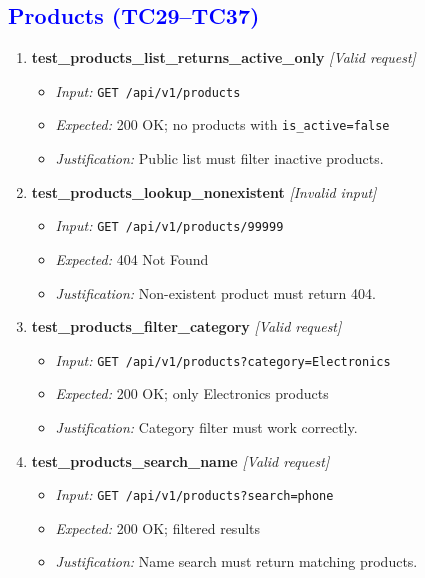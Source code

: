 \documentclass{article}
\begin{document}
\subsection*{\textcolor{blue}{Products (TC29--TC37)}}
\begin{enumerate}[resume, label=\textbf{TC\arabic*.}]

\item \textbf{test\_products\_list\_returns\_active\_only} \textit{[Valid request]}
\begin{itemize}[noitemsep]
  \item \textit{Input:} \texttt{GET /api/v1/products}
  \item \textit{Expected:} 200 OK; no products with \texttt{is\_active=false}
  \item \textit{Justification:} Public list must filter inactive products.
\end{itemize}

\item \textbf{test\_products\_lookup\_nonexistent} \textit{[Invalid input]}
\begin{itemize}[noitemsep]
  \item \textit{Input:} \texttt{GET /api/v1/products/99999}
  \item \textit{Expected:} 404 Not Found
  \item \textit{Justification:} Non-existent product must return 404.
\end{itemize}

\item \textbf{test\_products\_filter\_category} \textit{[Valid request]}
\begin{itemize}[noitemsep]
  \item \textit{Input:} \texttt{GET /api/v1/products?category=Electronics}
  \item \textit{Expected:} 200 OK; only Electronics products
  \item \textit{Justification:} Category filter must work correctly.
\end{itemize}

\item \textbf{test\_products\_search\_name} \textit{[Valid request]}
\begin{itemize}[noitemsep]
  \item \textit{Input:} \texttt{GET /api/v1/products?search=phone}
  \item \textit{Expected:} 200 OK; filtered results
  \item \textit{Justification:} Name search must return matching products.
\end{itemize}


\end{enumerate}
\end{document}

